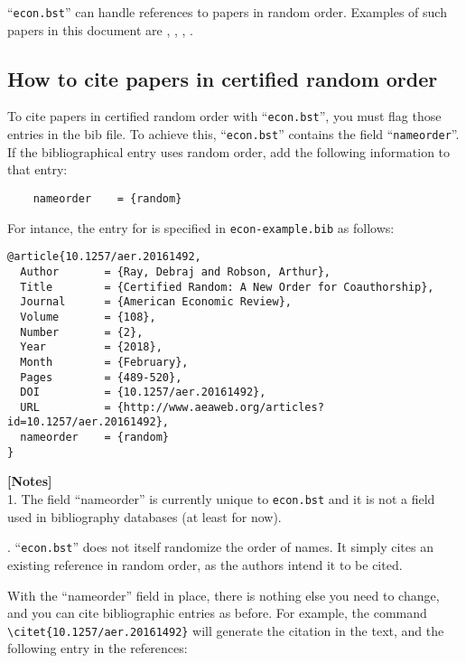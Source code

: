 \documentclass[10pt]{article}
\begin{document}
``\texttt{econ.bst}'' can handle references to papers in random order. Examples
of such papers in this document are \citet{10.1257/aer.20161492},
\citet{RePEc:hka:wpaper:2018-037}, \citet{vohra18:_maxim_farsig_stabl_set},
\citet{NBERw25205}.


\subsection{How to cite papers in certified random order}

To cite papers in certified random order with ``\texttt{econ.bst}'', you must
flag those entries in the bib file.  To achieve this, ``\texttt{econ.bst}''
contains the field ``\texttt{nameorder}''. If the bibliographical entry uses
random order, add the following information to that entry:
\begin{verbatim}
    nameorder    = {random}
\end{verbatim}

For intance, the entry for \citet{10.1257/aer.20161492} is specified in
\texttt{econ-example.bib} as follows:
\begin{verbatim}
@article{10.1257/aer.20161492,
  Author       = {Ray, Debraj and Robson, Arthur},
  Title        = {Certified Random: A New Order for Coauthorship},
  Journal      = {American Economic Review},
  Volume       = {108},
  Number       = {2},
  Year         = {2018},
  Month        = {February},
  Pages        = {489-520},
  DOI          = {10.1257/aer.20161492},
  URL          = {http://www.aeaweb.org/articles?id=10.1257/aer.20161492},
  nameorder    = {random}
}
\end{verbatim}

\noindent \textbf{[Notes]} \\
1. The field ``nameorder'' is currently unique to \texttt{econ.bst} and it
is not a field used in bibliography databases (at least for now).

. ``\texttt{econ.bst}'' does not itself randomize the order of
names. It simply cites an existing reference in random order, as the authors
intend it to be cited.
\vspace*{1em}


With the ``nameorder'' field in place, there is nothing else you need to change,
and you can cite bibliographic entries as before.  For example, the command
\verb|\citet{10.1257/aer.20161492}| will generate the citation
\citet{10.1257/aer.20161492} in the text, and the following entry in the
references:
\end{document}
